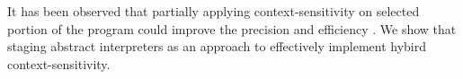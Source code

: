 It has been observed that partially applying context-sensitivity on selected
portion of the program could improve the precision and efficiency
\cite{zipper2018, Kastrinis:2013:HCP:2491956.2462191}. We show that staging
abstract interpreters as an approach to effectively implement hybird
context-sensitivity\todo{}.
\fi

